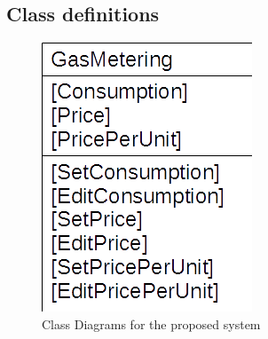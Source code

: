 \subsection{Class definitions}
\begin{figure}[H]
    \includegraphics[width=\textwidth]{./GasMetering.png}
    \caption{Class Diagrams for the proposed system} \label{fig:GasMetering Class Diagram}
\end{figure}
